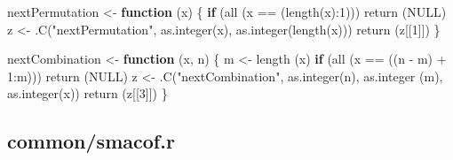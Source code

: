 \documentclass[
  12pt,
  letterpaper,
  DIV=11,
  numbers=noendperiod]{scrreprt}
\newenvironment{Shaded}{\begin{snugshade}}{\end{snugshade}}
\newcommand{\ConstantTok}[1]{\textcolor[rgb]{0.56,0.35,0.01}{#1}}
\newcommand{\ControlFlowTok}[1]{\textcolor[rgb]{0.00,0.23,0.31}{\textbf{#1}}}
\newcommand{\DecValTok}[1]{\textcolor[rgb]{0.68,0.00,0.00}{#1}}
\newcommand{\FunctionTok}[1]{\textcolor[rgb]{0.28,0.35,0.67}{#1}}
\newcommand{\NormalTok}[1]{\textcolor[rgb]{0.00,0.23,0.31}{#1}}
\newcommand{\OtherTok}[1]{\textcolor[rgb]{0.00,0.23,0.31}{#1}}
\newcommand{\SpecialCharTok}[1]{\textcolor[rgb]{0.37,0.37,0.37}{#1}}
\newcommand{\StringTok}[1]{\textcolor[rgb]{0.13,0.47,0.30}{#1}}
\theoremstyle{remark}
\begin{document}
\begin{Shaded}
\begin{Highlighting}[]
\NormalTok{nextPermutation }\OtherTok{\textless{}{-}} \ControlFlowTok{function}\NormalTok{ (x) \{}
  \ControlFlowTok{if}\NormalTok{ (}\FunctionTok{all}\NormalTok{ (x }\SpecialCharTok{==}\NormalTok{ (}\FunctionTok{length}\NormalTok{(x)}\SpecialCharTok{:}\DecValTok{1}\NormalTok{)))}
    \FunctionTok{return}\NormalTok{ (}\ConstantTok{NULL}\NormalTok{)}
\NormalTok{  z }\OtherTok{\textless{}{-}} \FunctionTok{.C}\NormalTok{(}\StringTok{"nextPermutation"}\NormalTok{, }\FunctionTok{as.integer}\NormalTok{(x), }\FunctionTok{as.integer}\NormalTok{(}\FunctionTok{length}\NormalTok{(x)))}
  \FunctionTok{return}\NormalTok{ (z[[}\DecValTok{1}\NormalTok{]])}
\NormalTok{\}}

\NormalTok{nextCombination }\OtherTok{\textless{}{-}} \ControlFlowTok{function}\NormalTok{ (x, n) \{}
\NormalTok{  m }\OtherTok{\textless{}{-}} \FunctionTok{length}\NormalTok{ (x)}
  \ControlFlowTok{if}\NormalTok{ (}\FunctionTok{all}\NormalTok{ (x }\SpecialCharTok{==}\NormalTok{ ((n }\SpecialCharTok{{-}}\NormalTok{ m) }\SpecialCharTok{+} \DecValTok{1}\SpecialCharTok{:}\NormalTok{m)))}
    \FunctionTok{return}\NormalTok{ (}\ConstantTok{NULL}\NormalTok{)}
\NormalTok{  z }\OtherTok{\textless{}{-}}
    \FunctionTok{.C}\NormalTok{(}\StringTok{"nextCombination"}\NormalTok{,}
       \FunctionTok{as.integer}\NormalTok{(n),}
       \FunctionTok{as.integer}\NormalTok{ (m),}
       \FunctionTok{as.integer}\NormalTok{(x))}
  \FunctionTok{return}\NormalTok{ (z[[}\DecValTok{3}\NormalTok{]])}
\NormalTok{\}}
\end{Highlighting}
\end{Shaded}

\subsection*{common/smacof.r}\label{apsmacofcode}
\end{document}
